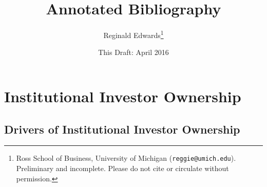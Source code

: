 \documentclass[12pt, letterpaper]{article}
\begin{document}
\title{Annotated Bibliography}
\author{Reginald Edwards\footnote{Ross School of Business, University of 
Michigan (\texttt{reggie@umich.edu}). Preliminary and incomplete. Please do not cite or circulate 
without permission.}}
\date{This Draft: April 2016}

\maketitle

\section{Institutional Investor Ownership}
\subsection{Drivers of Institutional Investor Ownership}
\end{document}
